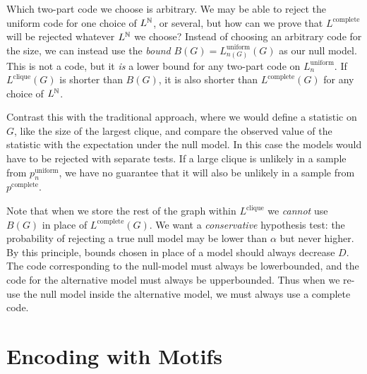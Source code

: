 Which two-part code we choose is arbitrary. We may be able to reject the uniform code for one choice of $L^{\mathbb N}$, or several, but how can we prove that $L^\text{complete}$ will be rejected whatever $L^{\mathbb N}$ we choose? Instead of choosing an arbitrary code for the size, we can instead use the \emph{bound} $B(G) = L^\text{uniform}_{n(G)}(G)$ as our null model. This is not a code, but it \emph{is} a lower bound for any two-part code on $L^\text{uniform}_n$. If $L^\text{clique}(G)$ is shorter than $B(G)$, it is also shorter than $L^\text{complete}(G)$ for any choice of $L^{\mathbb N}$.\footnotemark


Contrast this with the traditional approach, where we would define a statistic on $G$, like the size of the largest clique, and compare the observed value of the statistic with the expectation under the null model. In this case the models would have to be rejected with separate tests. If a large clique is unlikely in a sample from $p^\text{uniform}_n$, we have no guarantee that it will also be unlikely in a sample from $p^\text{complete}$. 

Note that when we store the rest of the graph within $L^\text{clique}$ we \emph{cannot} use $B(G)$ in place of $L^\text{complete}(G)$. We want a \emph{conservative} hypothesis test: the probability of rejecting a true null model may be lower than $\alpha$ but never higher. By this principle, bounds chosen in place of a model should always decrease $D$. The code corresponding to the null-model must always be lowerbounded, and the code for the alternative model must always be upperbounded. Thus when we re-use the null model inside the alternative model, we must always use a complete code.

\section*{Encoding with Motifs}

\label{section:motif-code}

